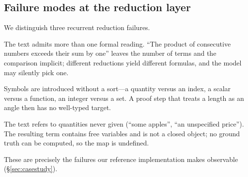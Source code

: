 \documentclass[11pt,a4paper]{article}
\theoremstyle{plain}
\theoremstyle{definition}
\theoremstyle{remark}
\begin{document}
\subsection{Failure modes at the reduction layer}
We distinguish three recurrent reduction failures.
\begin{description}[leftmargin=2.2em,itemsep=2pt,topsep=3pt]
\item[Ambiguity (semantic instability).] The text admits more than one
formal reading. ``The product of consecutive numbers exceeds their sum by
one'' leaves the number of terms and the comparison implicit; different
reductions yield different formulas, and the model may silently pick one.
\item[Missing typing.] Symbols are introduced without a sort---a quantity
versus an index, a scalar versus a function, an integer versus a set. A
proof step that treats a length as an angle then has no well-typed target.
\item[Non-invertibility and free variables.] The text refers to quantities
never given (``some apples'', ``an unspecified price''). The resulting term
contains free variables and is not a closed object; no ground truth can be
computed, so the map is undefined.
\end{description}
These are precisely the failures our reference implementation makes
observable (\S\ref{sec:casestudy}).
\end{document}
